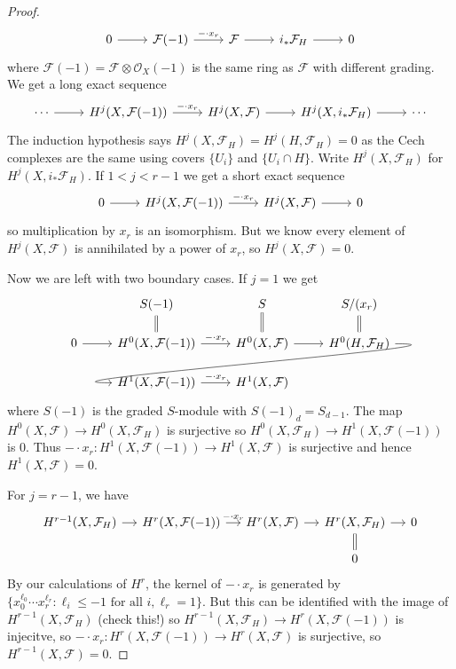 \documentclass[a4paper]{article}
\newcommand{\sh}[1]{\mathcal{#1}} %
\begin{document}
\begin{proof}
  \[
    \begin{tikzcd}
      0 \ar[r] & \sh F(-1) \ar[r, "-\cdot x_r"] & \sh F \ar[r] & i_* \sh F_H \ar[r] & 0
    \end{tikzcd}
  \]
  where \(\sh F(-1) = \sh F \otimes \sh O_X(-1)\) is the same ring as \(\sh F\) with different grading. We get a long exact sequence
  \[
    \begin{tikzcd}
      \cdots \ar[r] & H^j(X, \sh F(-1)) \ar[r, "- \cdot x_r"] & H^j(X, \sh F) \ar[r] & H^j(X, i_* \sh F_H) \ar[r] & \cdots
    \end{tikzcd}
  \]
  The induction hypothesis says \(H^j(X, \sh F_H) = H^j(H, \sh F_H) = 0\) as the Cech complexes are the same using covers \(\{U_i\}\) and \(\{U_i \cap H\}\). Write \(H^j(X, \sh F_H)\) for \(H^j(X, i_* \sh F_H)\). If \(1 < j < r - 1\) we get a short exact sequence
  \[
    \begin{tikzcd}
      0 \ar[r] & H^j(X, \sh F(-1)) \ar[r, "- \cdot x_r"] & H^j(X, \sh F) \ar[r] & 0
    \end{tikzcd}
  \]
  so multiplication by \(x_r\) is an isomorphism. But we know every element of \(H^j(X, \sh F)\) is annihilated by a power of \(x_r\), so \(H^j(X, \sh F) = 0\).

  Now we are left with two boundary cases. If \(j = 1\) we get
  \[
    \begin{tikzcd}[row sep=scriptsize]
      & S(-1) \ar[d, equal] & S \ar[d, equal] & S/(x_r) \ar[d, equal] \\
      0 \ar[r] & H^0(X, \sh F(-1)) \ar[r, "- \cdot x_r"] & H^0(X, \sh F) \ar[r] & H^0(H, \sh F_H) \ar[dll, overlay, in=180, out=0] \\
      & H^1(X, \sh F(-1)) \ar[r, "- \cdot x_r"] & H^1(X, \sh F)
    \end{tikzcd}
  \]
  where \(S(-1)\) is the graded \(S\)-module with \(S(-1)_d = S_{d - 1}\). The map \(H^0(X, \sh F) \to H^0(X, \sh F_H)\) is surjective so \(H^0(X, \sh F_H) \to H^1(X, \sh F(-1))\) is \(0\). Thus \(- \cdot x_r: H^1(X, \sh F(-1)) \to H^1(X, \sh F)\) is surjective and hence \(H^1(X, \sh F) = 0\).

  For \(j = r - 1\), we have
  \[
    \begin{tikzcd}[row sep=scriptsize, column sep=small]
      H^{r - 1}(X, \sh F_H) \ar[r] & H^r(X, \sh F(-1)) \ar[r, "- \cdot x_r"] & H^r(X, \sh F) \ar[r] & H^r(X, \sh F_H) \ar[d, equal] \ar[r] & 0 \\
      & & & 0
    \end{tikzcd}
  \]
  By our calculations of \(H^r\), the kernel of \(- \cdot x_r\) is generated by \(\{x_0^{\ell_0} \cdots x_r^{\ell_r}: \ell_i \leq -1 \text{ for all } i, \ell_r = 1\}\). But this can be identified with the image of \(H^{r - 1}(X, \sh F_H)\) (check this!) so \(H^{r - 1}(X, \sh F_H) \to H^r(X, \sh F(-1))\) is injecitve, so \(- \cdot x_r: H^r(X, \sh F(-1)) \to H^r(X, \sh F)\) is surjective, so \(H^{r - 1}(X, \sh F) = 0\).
\end{proof}
\end{document}
